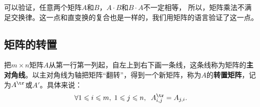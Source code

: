 \documentclass[12pt,UTF8,fontset=none]{ctexbook}
\begin{document}
可以验证，任意两个矩阵$A$和$B$，$A\cdot B$和$B \cdot A$不一定相等，
所以，矩阵乘法不满足交换律。这一点和直变换的复合也是一样的，我们用矩阵的语言验证了这一点。






\subsection{矩阵的转置}
把$m\times n$矩阵$A$从第一行第一列起，自左上到右下画一条线，这条线称为矩阵的\textbf{主对角线}。以主对角线为轴把矩阵“翻转”，得到一个新矩阵，称为$A$的\textbf{转置矩阵}，记为$A^{\tr}$或$A'$。具体来说：
$$ \forall 1\leqslant i \leqslant m, \; 1 \leqslant j \leqslant n, \;\; A^{\tr}_{i,j} = A_{j, i}.$$
\end{document}
